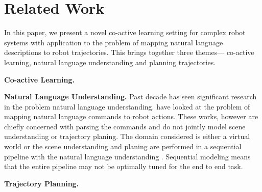 \section{Related Work}
In this paper, we present a novel co-active learning setting for complex robot systems with application to the problem of mapping natural language descriptions to robot trajectories. This brings together three themes--- co-active learning, natural language understanding and planning trajectories.

\noindent\textbf{Co-active Learning.}

\noindent\textbf{Natural Language Understanding.}  Past decade has seen significant research in the problem natural language understanding. \cite{tellex2011understanding,fasola2013using,misra2014tell,chen2010training,artzi2013weakly,matuszek2012grounded, Mei2015Navigational,branavan2012learning} have looked at the problem of mapping natural language commands to robot actions. These works, however are chiefly concerned with parsing the commands and do not jointly model scene understanding or trajectory planing. The domain considered is either a virtual world \cite{chen2010training,artzi2013weakly,matuszek2012grounded, Mei2015Navigational,branavan2012learning} or the scene understanding and planing are performed in a sequential pipeline with the natural language understanding \cite{tellex2011understanding,misra2014tell}. Sequential modeling means that the entire pipeline may not be optimally tuned for the end to end task. 

\noindent\textbf{Trajectory Planning.}

\iffalse
The TellMeDave system translates natural language sentences to actions
sequences. PlanIt systems evaluates planning trajectories based on human
context. We have combined the systems resulting in an end-to-end system which
uses RoboBrain for features running on Weaver. 
\fi

